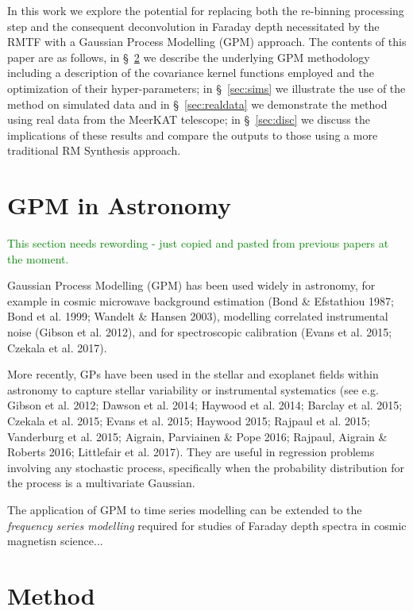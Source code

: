 \documentclass[fleqn,usenatbib]{mnras}
\begin{document}
In this work we explore the potential for replacing both the re-binning processing step and the consequent deconvolution in Faraday depth necessitated by the RMTF with a Gaussian Process Modelling (GPM) approach. The contents of this paper are as follows, in \S~\ref{sec:method} we describe the underlying GPM methodology including a description of the covariance kernel functions employed and the optimization of their hyper-parameters; in \S~\ref{sec:sims} we illustrate the use of the method on simulated data and in \S~\ref{sec:realdata} we demonstrate the method using real data from the MeerKAT telescope; in \S~\ref{sec:disc} we discuss the implications of these results and compare the outputs to those using a more traditional RM Synthesis approach. 

\section{GPM in Astronomy}
\label{sec:astrogpm}

\textcolor{green}{This section needs rewording - just copied and pasted from previous papers at the moment.}

Gaussian Process Modelling (GPM) has been used widely in astronomy, for example in cosmic microwave background estimation (Bond \& Efstathiou 1987; Bond et al. 1999; Wandelt \& Hansen 2003), modelling correlated instrumental noise (Gibson et al. 2012), and for spectroscopic calibration (Evans et al. 2015; Czekala et al. 2017).

More recently, GPs have been used in the stellar and exoplanet fields within astronomy to capture stellar variability or instrumental systematics (see e.g. Gibson et al. 2012; Dawson et al. 2014; Haywood et al. 2014; Barclay et al. 2015; Czekala et al. 2015; Evans et al. 2015; Haywood 2015; Rajpaul et al. 2015; Vanderburg et al. 2015; Aigrain, Parviainen \& Pope 2016; Rajpaul, Aigrain & Roberts 2016; Littlefair et al. 2017). They are useful in regression problems involving any stochastic process, specifically when the probability distribution for the process is a multivariate Gaussian.

The application of GPM to time series modelling can be extended to the {\it frequency series modelling} required for studies of Faraday depth spectra in cosmic magnetisn science...

\section{Method}
\label{sec:method}
\end{document}
